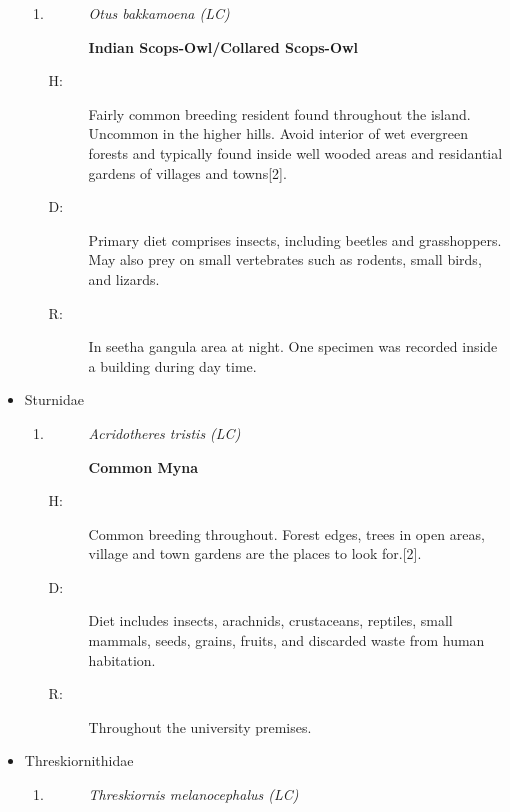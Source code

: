 \begin{itemize}
\begin{enumerate}
\item%
\begin{description}%
\item[]%
\textit{Otus bakkamoena (LC)}%
\item[]%
\textbf{Indian Scops{-}Owl/Collared Scops{-}Owl}%
\end{description}%
\begin{description}%
\item[H: ]%
Fairly common breeding resident found throughout the island. Uncommon in the higher hills. Avoid interior of wet evergreen forests and typically found inside well wooded areas and residantial gardens of villages and towns{[}2{]}.%
\item[D: ]%
Primary diet comprises insects, including beetles and grasshoppers. May also prey on small vertebrates such as rodents, small birds, and lizards.%
\item[R: ]%
In seetha gangula area at night. One specimen was recorded inside a building during day time.%
\end{description}%
\end{enumerate}%
\item%
Sturnidae%
\begin{enumerate}%
\item%
\begin{description}%
\item[]%
\textit{Acridotheres tristis (LC)}%
\item[]%
\textbf{Common Myna}%
\end{description}%
\begin{description}%
\item[H: ]%
Common breeding throughout. Forest edges, trees in open areas, village and town gardens are the places to look for.{[}2{]}.%
\item[D: ]%
Diet includes insects, arachnids, crustaceans, reptiles, small mammals, seeds, grains, fruits, and discarded waste from human habitation.%
\item[R: ]%
Throughout the university premises.%
\end{description}%
\end{enumerate}%
\item%
Threskiornithidae%
\begin{enumerate}%
\item%
\begin{description}%
\item[]%
\textit{Threskiornis melanocephalus (LC)}%
\item[]%

\end{description}
\end{enumerate}
\end{itemize}
